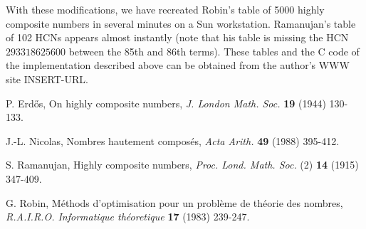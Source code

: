 \documentclass[12pt]{article}
\begin{document}
With these modifications, we have recreated Robin's table of 5000 
highly composite numbers in several minutes on a Sun workstation. 
Ramanujan's table of 102 HCNs appears almost instantly (note that his 
table is missing the HCN $293318625600$ between the 85th and 86th 
terms). These tables and the C code of the implementation described 
above can be obtained from the author's WWW site INSERT-URL.

\begin{thebibliography}{9}
P. Erd\H{o}s, On highly composite numbers, \textit{J. London Math. 
Soc.} \textbf{19} (1944) 130-133.

J.-L. Nicolas, Nombres hautement compos\'es, \textit{Acta Arith.} 
\textbf{49} (1988) 395-412.

S. Ramanujan, Highly composite numbers, \textit{Proc. Lond. Math. Soc.} 
(2) \textbf{14} (1915) 347-409.

G. Robin, M\'ethods d'optimisation pour un probl\`eme de th\'eorie des 
nombres, \textit{R.A.I.R.O. Informatique th\'eoretique} \textbf{17} 
(1983) 239-247.
\end{thebibliography}
\end{document}
